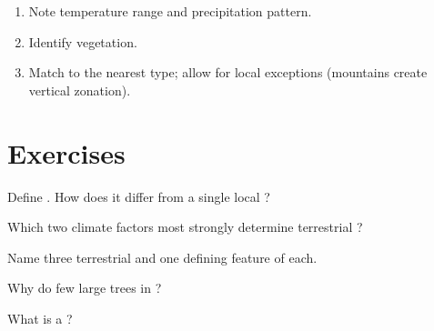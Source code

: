 \begin{method}\label{met:g8:biomes:id}
\begin{enumerate}
  \item Note temperature range and precipitation pattern.
  \item Identify  vegetation.
  \item Match to the nearest  type; allow for local exceptions
        (mountains create vertical zonation).
\end{enumerate}
\end{method}

\section{Exercises}

\begin{exercise}[$\star$]\label{exo:g8:biomes:1}
Define . How does it differ from a single local ?
\end{exercise}

\begin{exercise}[$\star$]\label{exo:g8:biomes:2}
Which two climate factors most strongly determine terrestrial ?
\end{exercise}

\begin{exercise}[$\star$]\label{exo:g8:biomes:3}
Name three terrestrial  and one defining feature of each.
\end{exercise}

\begin{exercise}[$\star$]\label{exo:g8:biomes:4}
Why do few large trees  in ?
\end{exercise}

\begin{exercise}[$\star$]\label{exo:g8:biomes:5}
What is a ?
\end{exercise}

